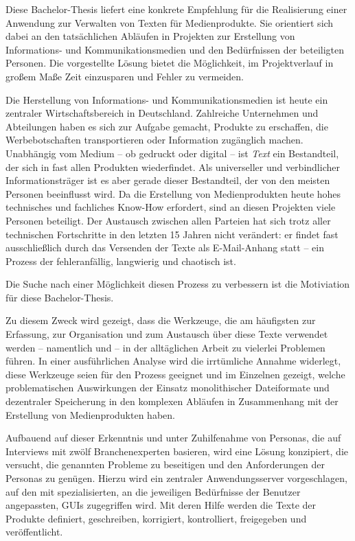 Diese Bachelor-Thesis liefert eine konkrete Empfehlung für die Realisierung einer Anwendung zur Verwalten von Texten für Medienprodukte. Sie orientiert sich dabei an den tatsächlichen Abläufen in Projekten zur Erstellung von Informations- und Kommunikationsmedien und den Bedürfnissen der beteiligten Personen. Die vorgestellte Lösung bietet die Möglichkeit, im Projektverlauf in großem Maße Zeit einzusparen und Fehler zu vermeiden.

\secbar

Die Herstellung von Informations- und Kommunikationsmedien ist heute ein zentraler Wirtschaftsbereich in Deutschland. Zahlreiche Unternehmen und Abteilungen haben es sich zur Aufgabe gemacht, Produkte zu erschaffen, die Werbebotschaften transportieren oder Information zugänglich machen. Unabhängig vom Medium -- ob gedruckt oder digital -- ist \emph{Text} ein Bestandteil, der sich in fast allen Produkten wiederfindet. Als universeller und verbindlicher Informationsträger ist es aber gerade dieser Bestandteil, der von den meisten Personen beeinflusst wird. Da die Erstellung von Medienprodukten heute hohes technisches und fachliches Know-How erfordert, sind an diesen Projekten viele Personen beteiligt. Der Austausch zwischen allen Parteien hat sich trotz aller technischen Fortschritte in den letzten 15 Jahren nicht verändert: er findet fast ausschließlich durch das Versenden der Texte als E-Mail-Anhang statt -- ein Prozess der fehleranfällig, langwierig und chaotisch ist. 

Die Suche nach einer Möglichkeit diesen Prozess zu verbessern ist die Motiviation für diese Bachelor-Thesis. 

Zu diesem Zweck wird gezeigt, dass die Werkzeuge, die am häufigsten zur Erfassung, zur Organisation und zum Austausch über diese Texte verwendet werden -- namentlich  und  -- in der alltäglichen Arbeit zu vielerlei Problemen führen. In einer ausführlichen Analyse wird die irrtümliche Annahme widerlegt, diese Werkzeuge seien für den Prozess geeignet und im Einzelnen gezeigt, welche problematischen Auswirkungen der Einsatz monolithischer Dateiformate und dezentraler Speicherung in den komplexen Abläufen in Zusammenhang mit der Erstellung von Medienprodukten haben.

Aufbauend auf dieser Erkenntnis und unter Zuhilfenahme von Personas, die auf Interviews mit zwölf Branchenexperten basieren, wird eine Lösung konzipiert, die versucht, die genannten Probleme zu beseitigen und den Anforderungen der Personas zu genügen. Hierzu wird ein zentraler Anwendungsserver vorgeschlagen, auf den mit spezialisierten, an die jeweiligen Bedürfnisse der Benutzer angepassten, GUIs zugegriffen wird. Mit deren Hilfe werden die Texte der Produkte definiert, geschreiben, korrigiert, kontrolliert, freigegeben und veröffentlicht.

